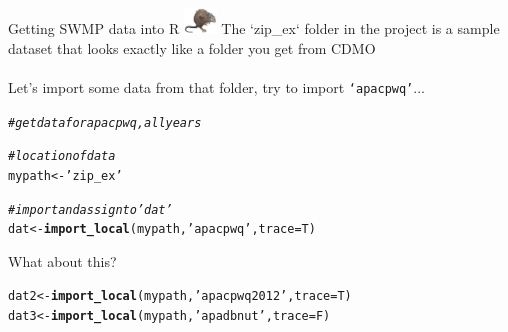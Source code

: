 \documentclass[xcolor=dvipsnames,serif]{beamer}\usepackage[]{graphicx}\usepackage[]{color}
\makeatletter
\newcommand{\hlstr}[1]{\textcolor[rgb]{0.192,0.494,0.8}{#1}}%
\newcommand{\hlcom}[1]{\textcolor[rgb]{0.678,0.584,0.686}{\textit{#1}}}%
\newcommand{\hlstd}[1]{\textcolor[rgb]{0.345,0.345,0.345}{#1}}%
\newcommand{\hlkwb}[1]{\textcolor[rgb]{0.69,0.353,0.396}{#1}}%
\newcommand{\hlkwc}[1]{\textcolor[rgb]{0.333,0.667,0.333}{#1}}%
\newcommand{\hlkwd}[1]{\textcolor[rgb]{0.737,0.353,0.396}{\textbf{#1}}}%
\newenvironment{kframe}{%
 \def\at@end@of@kframe{}%
 \ifinner\ifhmode%
  \def\at@end@of@kframe{\end{minipage}}%
  \begin{minipage}{\columnwidth}%
 \fi\fi%
 \def\FrameCommand##1{\hskip\@totalleftmargin \hskip-\fboxsep
 \colorbox{shadecolor}{##1}\hskip-\fboxsep
     \hskip-\linewidth \hskip-\@totalleftmargin \hskip\columnwidth}%
 \MakeFramed {\advance\hsize-\width
   \@totalleftmargin\z@ \linewidth\hsize
   \@setminipage}}%
 {\par\unskip\endMakeFramed%
 \at@end@of@kframe}
\newenvironment{knitrout}{}{} %
\makeatother
\begin{document}
\begin{frame}[fragile]{Getting SWMP data into R \includegraphics[width = 0.065\textwidth]{imgs/swmprat.png}}
\onslide<+->
The `zip\_ex` folder in the project is a sample dataset that looks exactly like a folder you get from CDMO \\~\\
Let's import some data from that folder, try to import \texttt{`apacpwq'}...
\onslide<+->
\begin{knitrout}\scriptsize
{}\color{fgcolor}\begin{kframe}
\begin{alltt}
\hlcom{# get data for apacpwq, all years}

\hlcom{# location of data}
\hlstd{mypath} \hlkwb{<-} \hlstr{'zip_ex'}

\hlcom{# import and assign to 'dat'}
\hlstd{dat} \hlkwb{<-} \hlkwd{import_local}\hlstd{(mypath,} \hlstr{'apacpwq'}\hlstd{,} \hlkwc{trace} \hlstd{= T)}
\end{alltt}
\end{kframe}
\end{knitrout}
\onslide<+->
What about this?
\begin{knitrout}\scriptsize
{}\color{fgcolor}\begin{kframe}
\begin{alltt}
\hlstd{dat2} \hlkwb{<-} \hlkwd{import_local}\hlstd{(mypath,} \hlstr{'apacpwq2012'}\hlstd{,} \hlkwc{trace} \hlstd{= T)}
\hlstd{dat3} \hlkwb{<-} \hlkwd{import_local}\hlstd{(mypath,} \hlstr{'apadbnut'}\hlstd{,} \hlkwc{trace} \hlstd{= F)}
\end{alltt}
\end{kframe}
\end{knitrout}

\end{frame}
\end{document}
